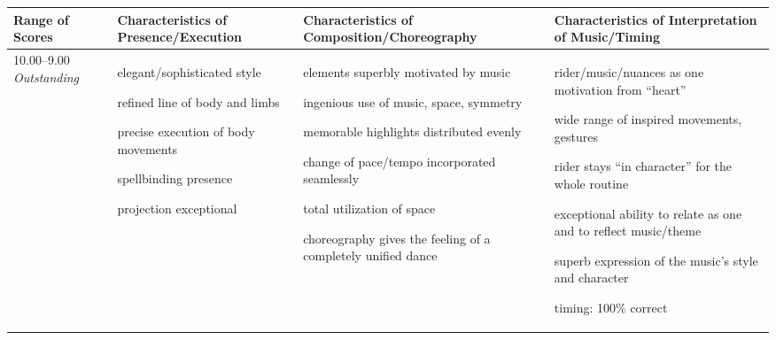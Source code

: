 \begingroup
    \fontsize{7pt}{9pt}\selectfont
\setlength{\LTleft}{-2.5cm} 
\begin{longtable}{|p{1.5cm}|p{5.5cm}|p{5.5cm}|p{5.5cm}|}
\hline
\textbf{Range of Scores} &
\textbf{Characteristics of \newline Presence/Execution} &
\textbf{Characteristics of \newline Composition/Choreography} &
\textbf{Characteristics of \newline Interpretation of Music/Timing} \\
\hline
10.00--9.00 \newline
\emph{Outstanding} &

\begin{judging_items}%
\item elegant/sophisticated style
\item refined line of body and limbs
\item precise execution of body movements
\item spellbinding presence
\item projection exceptional
\end{judging_items} &

\begin{judging_items}%
\item elements superbly motivated by music
\item ingenious use of music, space, symmetry
\item memorable highlights distributed evenly
\item change of pace/tempo incorporated seamlessly
\item total utilization of space
\item choreography gives the feeling of a completely unified dance 
\end{judging_items} &

\begin{judging_items}%
\item rider/music/nuances as one motivation from ``heart''
\item wide range of inspired movements, gestures
\item rider stays ``in character'' for the whole routine
\item exceptional ability to relate as one and to reflect music/theme
\item superb expression of the music's style and character
\item timing: 100\% correct
\end{judging_items} \\
\hline


\end{longtable}

